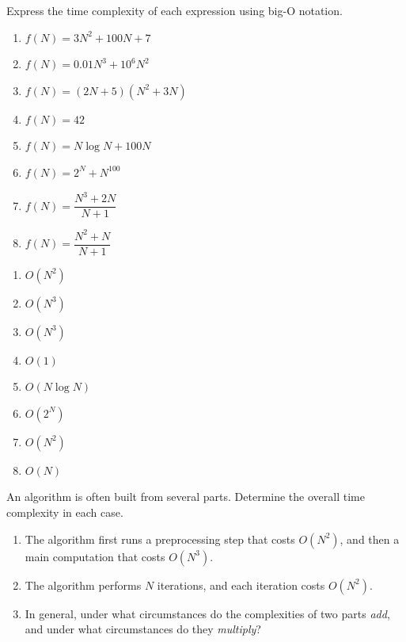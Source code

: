 \begin{exercise}
    Express the time complexity of each expression using big-O notation.
    \begin{enumerate}[label=(\alph*)]
        \item $f(N) = 3N^2 + 100N + 7$
        \item $f(N) = 0.01N^3 + 10^6 N^2$
        \item $f(N) = (2N + 5)(N^2 + 3N)$
        \item $f(N) = 42$
        \item $f(N) = N \log N + 100N$
        \item $f(N) = 2^N + N^{100}$
        \item $f(N) = \dfrac{N^3 + 2N}{N + 1}$
        \item $f(N) = \dfrac{N^2 + N}{N + 1}$
    \end{enumerate}
\end{exercise}

\begin{solution}
    \begin{enumerate}[label=(\alph*)]
        \item $O(N^2)$
        \item $O(N^3)$
        \item $O(N^3)$
        \item $O(1)$
        \item $O(N \log N)$
        \item $O(2^N)$
        \item $O(N^2)$
        \item $O(N)$
    \end{enumerate}
\end{solution}

\begin{exercise} %
    An algorithm is often built from several parts. Determine the overall time complexity in each case.
    \begin{enumerate}[label=(\alph*)]
        \item The algorithm first runs a preprocessing step that costs $O(N^2)$, and then a main computation that costs $O(N^3)$.
        \item The algorithm performs $N$ iterations, and each iteration costs $O(N^2)$.
        \item In general, under what circumstances do the complexities of two parts \emph{add}, and under what circumstances do they \emph{multiply}?
    \end{enumerate}
\end{exercise}

